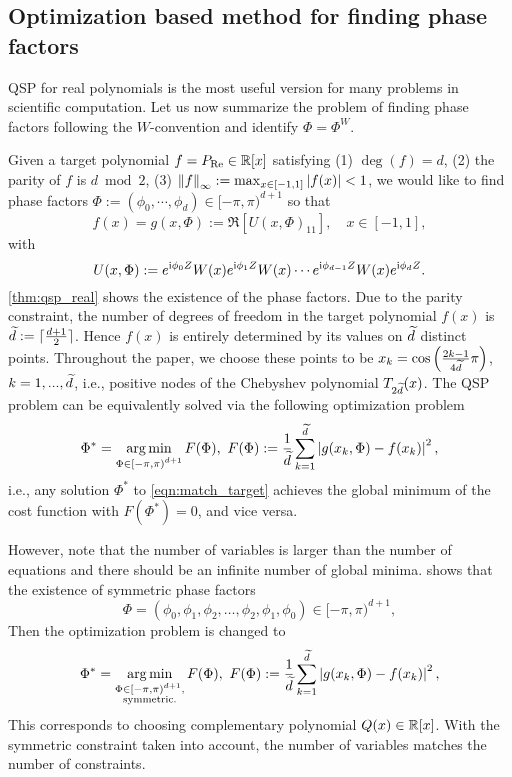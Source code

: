 \subsection{Optimization based method for finding phase factors}\label{sec:optimization_qsp}

QSP for real polynomials is the most useful version for many problems in scientific computation. 
Let us now summarize the problem of finding phase factors following the $W$-convention and identify $\Phi=\Phi^W$.

Given a target polynomial $f=P_{\operatorname{Re}}\in\mathbb{R}[x]$ satisfying (1) $\deg(f)=d$, (2) the  parity of $f$ is $d \bmod 2$, (3) $\left\lVert f\right\rVert_{\infty}:=\max_{x\in[-1,1]} \left\lvert f(x)\right\rvert< 1$, we would like to find phase factors $\Phi:=(\phi_0,\cdots,\phi_d)\in [-\pi,\pi)^{d+1}$
so that
\begin{equation}\label{eqn:match_target}
f(x)=g(x,\Phi):=\Re[U(x,\Phi)_{11}], \quad x\in[-1,1],
\end{equation}
with
\begin{equation}\label{eqn:unitary-qsvt}
    U(x, \Phi) := e^{\mathrm{i} \phi_0 Z} W(x) e^{\mathrm{i} \phi_1 Z} W(x) \cdots e^{\mathrm{i} \phi_{d-1} Z} W(x) e^{\mathrm{i} \phi_d Z}.
\end{equation}
\cref{thm:qsp_real} shows the existence of the phase factors. Due to the parity constraint, the number of degrees of freedom in the target polynomial $f(x)$ is $\widetilde{d} := \lceil \frac{d+1}{2} \rceil$. Hence $f(x)$ is entirely determined by its values on $\widetilde{d}$ distinct points. 
Throughout the paper, we choose these points to be $x_k=\cos\left(\frac{2k-1}{4\widetilde{d}}\pi\right)$, $k=1,...,\widetilde{d}$, i.e., positive nodes of the Chebyshev polynomial $T_{2 \widetilde{d}}(x)$. The QSP problem can be equivalently solved via the following optimization problem
\begin{equation}
    \Phi^* = \operatorname*{arg\,min}_{\substack{\Phi \in [-\pi,\pi)^{d+1}}} F(\Phi),\ F(\Phi) := \frac{1}{\widetilde{d}} \sum_{k=1}^{\widetilde{d}} \left\lvert g(x_k, \Phi) - f(x_k)\right\rvert^2,
\end{equation}
i.e., any solution $\Phi^*$ to \cref{eqn:match_target} achieves the global minimum of the cost function with $F(\Phi^*)=0$, and vice versa.

However, note that the number of variables is larger than the number of equations and there should be an infinite number of global minima. \cite[Theorem 2]{DongMengWhaleyEtAl2021} shows that the existence of symmetric phase factors 
\begin{equation}
\Phi=(\phi_0,\phi_1,\phi_2,\ldots,\phi_2,\phi_1,\phi_0)\in [-\pi,\pi)^{d+1},
\label{eqn:symmetry_phase}
\end{equation}
Then the optimization problem is changed to
\begin{equation}\label{eqn:opt_symm_qsp}
    \Phi^* = \operatorname*{arg\,min}_{\substack{\Phi \in [-\pi,\pi)^{d+1},\\
    \text{symmetric.}}} F(\Phi),\ F(\Phi) := \frac{1}{\widetilde{d}} \sum_{k=1}^{\widetilde{d}} \left\lvert g(x_k, \Phi) - f(x_k)\right\rvert^2,
\end{equation}
This corresponds to choosing complementary polynomial $Q(x)\in\mathbb{R}[x]$. 
With the symmetric constraint taken into account, the number of variables matches the number of constraints.

